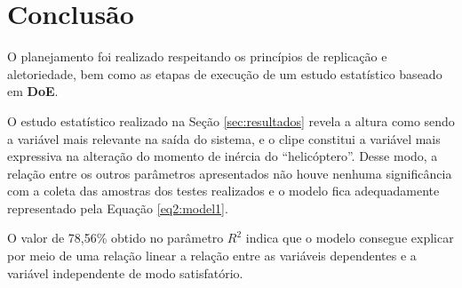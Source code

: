 \section{Conclusão}

O planejamento foi realizado respeitando os princípios de replicação e aletoriedade, bem como as etapas de execução de um estudo estatístico baseado em \textbf{DoE}.

O estudo estatístico realizado na Seção \ref{sec:resultados} revela a altura como sendo a variável mais relevante na saída do sistema, e o clipe constitui a variável mais expressiva na alteração do momento de inércia do ``helicóptero''. Desse modo, a relação entre os outros parâmetros apresentados não houve nenhuma significância com a coleta das amostras dos testes realizados e o modelo fica adequadamente representado pela Equação \ref{eq2:model1}.

O valor de 78,56\% obtido no parâmetro $R^2$ indica que o modelo consegue explicar por meio de uma relação linear a relação entre as variáveis dependentes e a variável independente de modo satisfatório.


